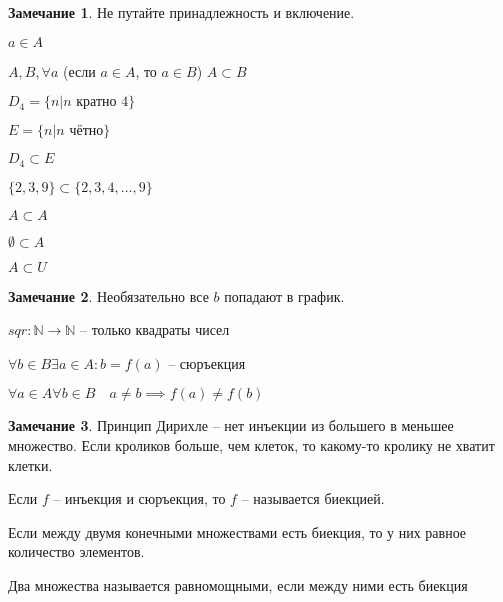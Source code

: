 \documentclass{book}
\newcommand\N{\ensuremath{\mathbb{N}}}
\renewcommand\O{\ensuremath{\emptyset}}
\theoremstyle{definition}
\newtheorem*{note}{Замечание}
\begin{document}
        \begin{note}
            Не путайте принадлежность и включение.

            $a\in A$

            $A, B, \forall a$ (если $a\in A$, то $a\in B$) $A\subset B$

            $D_4 = \{n|n\text{ кратно } 4\}$

            $E = \{n|n\text{ чётно}\}$

            $D_4\subset E$

            $\{2, 3, 9\} \subset  \{2, 3, 4, \ldots, 9\}$

            $A\subset A$

            $\O \subset A$

            $A\subset U$
        \end{note}

        \begin{note}
            Необязательно все $b$ попадают в график.
            
            $sqr:\N \to \N $ -- только квадраты чисел
        \end{note}

        \begin{definition}
            $\forall b\in B\exists a\in A: b = f(a)$ -- сюръекция
        \end{definition}

        \begin{definition}
            $\forall a\in A \forall b\in B\quad a\neq b \implies f(a)\neq f(b)$
        \end{definition}

        \begin{note}
            Принцип Дирихле -- нет инъекции из большего в меньшее множество. Если кроликов больше, чем клеток, то какому-то кролику не хватит клетки.
        \end{note}

        \begin{definition}
            Если $f$ -- инъекция и сюръекция, то $f$ -- называется биекцией.

            Если между двумя конечными множествами есть биекция, то у них равное количество элементов.
        \end{definition}

        \begin{definition}
            Два множества называется равномощными, если между ними есть биекция
        \end{definition}
\end{document}
